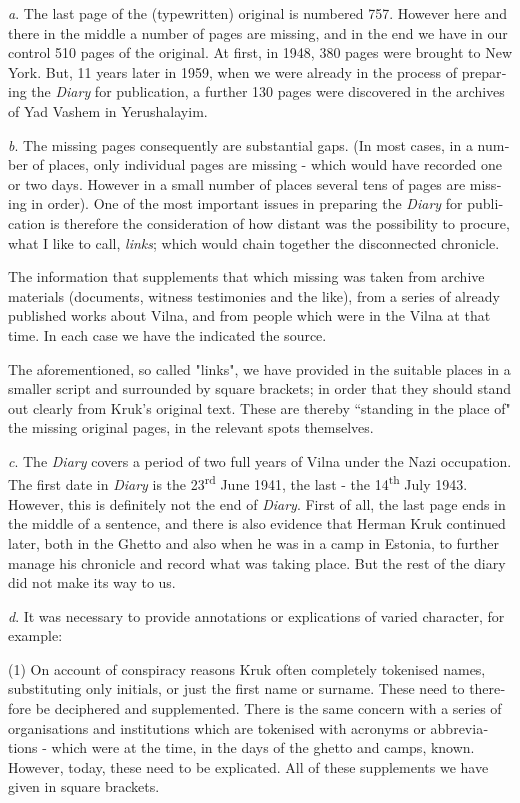 \documentclass{article}
\begin{document}
\begin{pairs}
\begin{Leftside}
\begin{english}
\emph{a}. The last page of the  (typewritten) original is numbered 757. However here and there in the middle a number of pages are missing,
and in the end we have in our control 510 pages of the original.
At first, in 1948, 380 pages were brought to New York. But, 11 years later in 1959, 
when we were already in the process of preparing the \emph{Diary} for publication, a further 130 pages were discovered in the archives of Yad Vashem in Yerushalayim.

\emph{b}. The missing pages consequently are substantial gaps. (In most cases, in a number of places, only individual pages are missing - which would have recorded one or two days. 
However in a small number of places several tens of pages are missing in order). 
One of the most important issues in preparing the \emph{Diary} for publication is
therefore the consideration of how distant was the possibility to procure, what I like to call, \emph{links};
which would chain together the disconnected chronicle.

The information that supplements that which missing was taken from archive materials 
(documents, witness testimonies and the like), from a series of already published works
about Vilna, and from people which were in the Vilna at that time. In each case we have the
indicated the source.
 
The aforementioned, so called "links", we have provided in the suitable places in a smaller
script and surrounded by square brackets; in order that they should stand out clearly from 
Kruk's original text. 
These are thereby ``standing in the place of" the missing original pages, in the relevant spots themselves.

\emph{c}. The \emph{Diary} covers a period of two full years of Vilna under the Nazi occupation.
The first date in \emph{Diary} is the 23\textsuperscript{rd} June 1941, the last - the 14\textsuperscript{th}
July 1943. However, this is definitely not the end of \emph{Diary}. First of all, the 
last page ends in the middle of a sentence, and there is also evidence that
Herman Kruk continued later, both in the Ghetto and also when he was in a camp in Estonia,
to further manage his chronicle and record what was taking place. But the rest of the diary
did not make its way to us.

\emph{d}. It was necessary to provide annotations or explications of varied character, for example:


(1) On account of conspiracy reasons Kruk often completely tokenised names, substituting
only initials, or just the first name or surname. These need to therefore be deciphered and
supplemented. There is the same concern with a series of organisations and institutions which
are tokenised with acronyms or abbreviations - which were at the time, in the days of the
ghetto and camps, known. However, today, these need to be explicated. All of these supplements we
have given in square brackets.


\endnumbering
\end{english}
\end{Leftside}

\end{pairs}
\Columns
\end{document}
